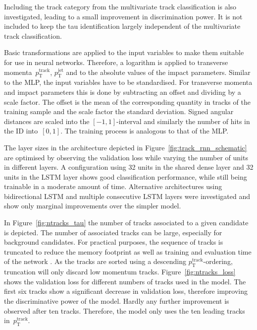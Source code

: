 Including the track category from the multivariate track classification is also
investigated, leading to a small improvement in discrimination power. It is not
included to keep the tau identification largely independent of the multivariate
track classification.

Basic transformations are applied to the input variables to make them suitable
for use in neural networks. Therefore, a logarithm is applied to transverse
momenta~$p_\text{T}^\text{track}$, $p_\text{T}^\text{jet}$ and to the absolute
values of the impact parameters. Similar to the MLP, the input variables have to
be standardised. For transverse momenta and impact parameters this is done by
subtracting an offset and dividing by a scale factor. The offset is the mean of
the corresponding quantity in tracks of the training sample and the scale factor
the standard deviation. Signed angular distances are scaled into the
$[-1, 1]$-interval and similarly the number of hits in the ID into~$[0, 1]$. The
training process is analogous to that of the MLP.

The layer sizes in the architecture depicted in
Figure~\ref{fig:track_rnn_schematic} are optimised by observing the validation
loss while varying the number of units in different layers. A configuration
using 32 units in the shared dense layer and 32 units in the LSTM layer shows
good classification performance, while still being trainable in a moderate
amount of time. Alternative architectures using bidirectional LSTM and multiple
consecutive LSTM layers were investigated and show only marginal improvements
over the simpler model.

In Figure~\ref{fig:ntracks_tau} the number of tracks associated to a given
\tauhadvis candidate is depicted. The number of associated tracks can be large,
especially for background candidates. For practical purposes, the sequence of
tracks is truncated to reduce the memory footprint as well as training and
evaluation time of the network . As the tracks are sorted using
a descending $p_\text{T}^\text{track}$-ordering, truncation will only discard
low momentum tracks. Figure~\ref{fig:ntracks_loss} shows the validation loss for
different numbers of tracks used in the model. The first six tracks show a
significant decrease in validation loss, therefore improving the discriminative
power of the model. Hardly any further improvement is observed after ten tracks.
Therefore, the model only uses the ten leading tracks
in~$p_\text{T}^\text{track}$.

